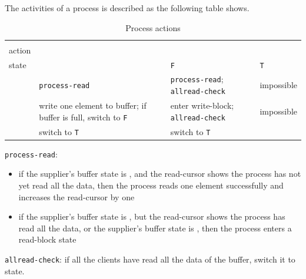 The activities of a process is described as the following table shows.


 \begin{table}[H]\large
 	\renewcommand\arraystretch{1.5}
 	\centering
 	\begin{tabular}{|l|p{}|p{}|l|}  
 		\hline
 		 \diagbox{Xducer \\ action}{Buffer \\ state} & \filling & \draining \texttt{F} & \draining \texttt{T} \\ \hline
 		\pin  & \texttt{process-read}  & \texttt{process-read}; \texttt{allread-check}  & impossible \\
 		\hline
 		\pout &  write one element to buffer;
 		if buffer is full, switch to \draining \texttt{F}    &    enter write-block; \texttt{allread-check}   & impossible \\ 
 		\hline
 		\done &  switch to \draining \texttt{T}      & switch to \draining \texttt{T}   & \skip  \\ 
 		\hline
 	\end{tabular}
 \caption{Process actions}
 \end{table}

\texttt{process-read}:

\begin{itemize}
	\item if the supplier's buffer state is \draining, and the read-cursor shows the process has not yet read all the data, then the process reads one element successfully and increases the read-cursor by one
	\item if the supplier's buffer state is \draining, but the read-cursor shows the process has read all the data, or the supplier's buffer state is \filling, then the process enters a read-block state
\end{itemize}


\texttt{allread-check}: if all the clients have read all the data of the buffer, switch it to \filling state.


